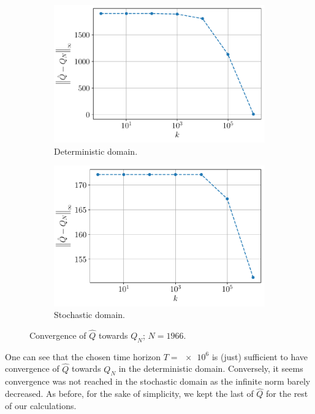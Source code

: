 \documentclass[a4paper, 12pt]{article}
\begin{document}
    \begin{figure}[h]
        \begin{subfigure}[b]{0.47\textwidth}
            \centering
            \includegraphics[width=\textwidth]{resources/pdf/5.1_deterministic.pdf}
            \caption{Deterministic domain.}
        \end{subfigure}
        \hfill
        \begin{subfigure}[b]{0.47\textwidth}
            \centering
            \includegraphics[width=\textwidth]{resources/pdf/5.1_stochastic.pdf}
            \caption{Stochastic domain.}
        \end{subfigure}
        \caption{Convergence of $\hat{Q}$ towards $Q_N$; $N = 1966$.}
        \label{fig:ql.convergence.speeds}
    \end{figure}
    
    One can see that the chosen time horizon $T = \num{e6}$ is (just) sufficient to have convergence of $\hat{Q}$ towards $Q_N$ in the deterministic domain. Conversely, it seems convergence was not reached in the stochastic domain as the infinite norm barely decreased. As before, for the sake of simplicity, we kept the last of $\hat{Q}$ for the rest of our calculations.
    
\end{document}
